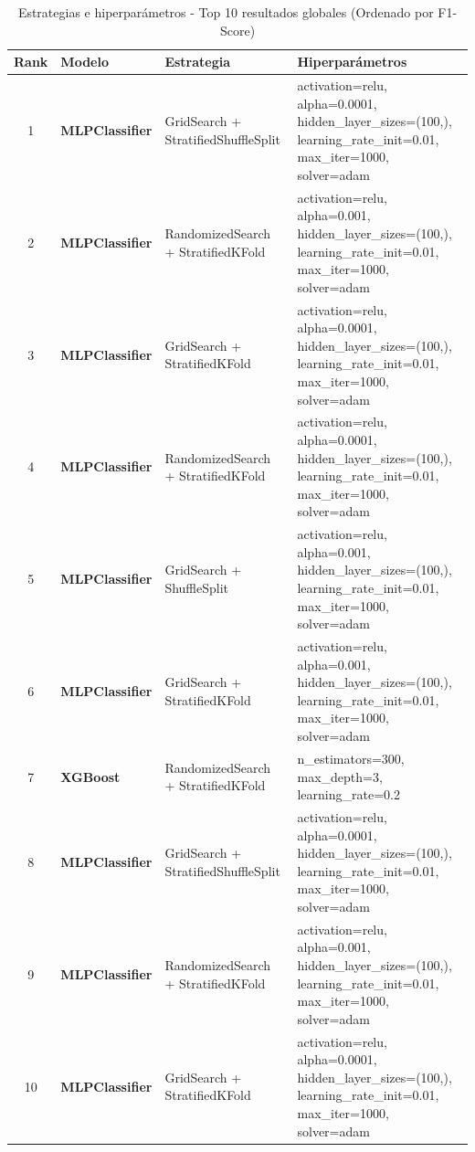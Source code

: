 \documentclass{article}
\begin{document}
\begin{table}[H]
    \centering
    \begin{tabular}{|c|l|l|p{3.5cm}|}
    \hline
    \rowcolor{tableblue} \textbf{Rank} & \textbf{Modelo} & \textbf{Estrategia} & \textbf{Hiperparámetros} \\
    \hline
    \rowcolor{purple!30} 1 & \textbf{MLPClassifier} & GridSearch + StratifiedShuffleSplit & \tiny{activation=relu, alpha=0.0001, hidden\_layer\_sizes=(100,), learning\_rate\_init=0.01, max\_iter=1000, solver=adam} \\
    \hline
    \rowcolor{blue!20} 2 & \textbf{MLPClassifier} & RandomizedSearch + StratifiedKFold & \tiny{activation=relu, alpha=0.001, hidden\_layer\_sizes=(100,), learning\_rate\_init=0.01, max\_iter=1000, solver=adam} \\
    \hline
    \rowcolor{purple!30} 3 & \textbf{MLPClassifier} & GridSearch + StratifiedKFold & \tiny{activation=relu, alpha=0.0001, hidden\_layer\_sizes=(100,), learning\_rate\_init=0.01, max\_iter=1000, solver=adam} \\
    \hline
    \rowcolor{purple!30} 4 & \textbf{MLPClassifier} & RandomizedSearch + StratifiedKFold & \tiny{activation=relu, alpha=0.0001, hidden\_layer\_sizes=(100,), learning\_rate\_init=0.01, max\_iter=1000, solver=adam} \\
    \hline
    \rowcolor{purple!30} 5 & \textbf{MLPClassifier} & GridSearch + ShuffleSplit & \tiny{activation=relu, alpha=0.001, hidden\_layer\_sizes=(100,), learning\_rate\_init=0.01, max\_iter=1000, solver=adam} \\
    \hline
    \rowcolor{green!20} 6 & \textbf{MLPClassifier} & GridSearch + StratifiedKFold & \tiny{activation=relu, alpha=0.001, hidden\_layer\_sizes=(100,), learning\_rate\_init=0.01, max\_iter=1000, solver=adam} \\
    \hline
    \rowcolor{yellow!60} 7 & \textbf{XGBoost} & RandomizedSearch + StratifiedKFold & \tiny{n\_estimators=300, max\_depth=3, learning\_rate=0.2} \\
    \hline
    \rowcolor{blue!20} 8 & \textbf{MLPClassifier} & GridSearch + StratifiedShuffleSplit & \tiny{activation=relu, alpha=0.0001, hidden\_layer\_sizes=(100,), learning\_rate\_init=0.01, max\_iter=1000, solver=adam} \\
    \hline
    \rowcolor{green!20} 9 & \textbf{MLPClassifier} & RandomizedSearch + StratifiedKFold & \tiny{activation=relu, alpha=0.001, hidden\_layer\_sizes=(100,), learning\_rate\_init=0.01, max\_iter=1000, solver=adam} \\
    \hline
    \rowcolor{orange!40} 10 & \textbf{MLPClassifier} & GridSearch + StratifiedKFold & \tiny{activation=relu, alpha=0.0001, hidden\_layer\_sizes=(100,), learning\_rate\_init=0.01, max\_iter=1000, solver=adam} \\
    \hline
    \end{tabular}%
    \caption{Estrategias e hiperparámetros - Top 10 resultados globales (Ordenado por F1-Score)}
    \label{tab:estrategias_top10}
\end{table}
\end{document}
